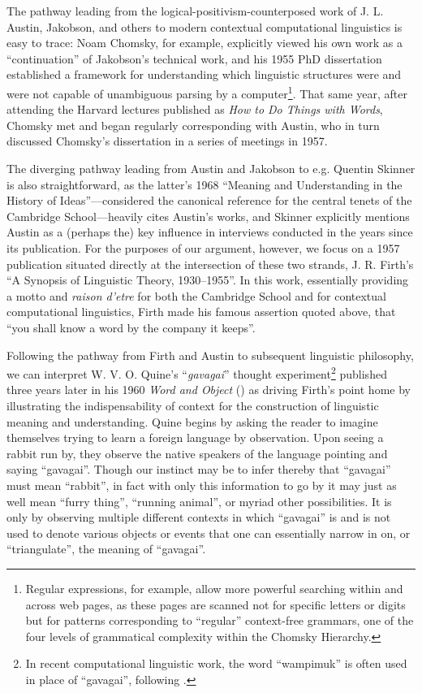 \documentclass[11pt]{article}
\begin{document}
The pathway leading from the logical-positivism-counterposed work of J. L. Austin, Jakobson, and others to modern contextual computational linguistics is easy to trace: Noam Chomsky, for example, explicitly viewed his own work as a ``continuation'' of Jakobson's technical work, and his 1955 PhD dissertation established a framework for understanding which linguistic structures were and were not capable of unambiguous parsing by a computer\footnote{Regular expressions, for example, allow more powerful searching within and across web pages, as these pages are scanned not for specific letters or digits but for patterns corresponding to ``regular'' context-free grammars, one of the four levels of grammatical complexity within the Chomsky Hierarchy.}. That same year, after attending the Harvard lectures published as \textit{How to Do Things with Words}, Chomsky met and began regularly corresponding with Austin, who in turn discussed Chomsky's dissertation in a series of meetings in 1957.
	
The diverging pathway leading from Austin and Jakobson to e.g. Quentin Skinner is also straightforward, as the latter's 1968 ``Meaning and Understanding in the History of Ideas''---considered the canonical reference for the central tenets of the Cambridge School---heavily cites Austin's works, and Skinner explicitly mentions Austin as a (perhaps the) key influence in interviews conducted in the years since its publication. For the purposes of our argument, however, we focus on a 1957 publication situated directly at the intersection of these two strands, J. R. Firth's ``A Synopsis of Linguistic Theory, 1930--1955''. In this work, essentially providing a motto and \textit{raison d'etre} for both the Cambridge School and for contextual computational linguistics, Firth made his famous assertion quoted above, that ``you shall know a word by the company it keeps''.
	
Following the pathway from Firth and Austin to subsequent linguistic philosophy, we can interpret W. V. O. Quine's ``\textit{gavagai}'' thought experiment\footnote{In recent computational linguistic work, the word ``wampimuk'' is often used in place of ``gavagai'', following \cite{lazaridou_this_2014}.} published three years later in his 1960 \textit{Word and Object} (\cite{quine_word_1960}) as driving Firth's point home by illustrating the indispensability of context for the construction of linguistic meaning and understanding. Quine begins by asking the reader to imagine themselves trying to learn a foreign language by observation. Upon seeing a rabbit run by, they observe the native speakers of the language pointing and saying ``gavagai''. Though our instinct may be to infer thereby that ``gavagai'' must mean ``rabbit'', in fact with only this information to go by it may just as well mean ``furry thing'', ``running animal'', or myriad other possibilities. It is only by observing multiple different contexts in which ``gavagai'' is and is not used to denote various objects or events that one can essentially narrow in on, or ``triangulate'', the meaning of ``gavagai''.
	
\end{document}

